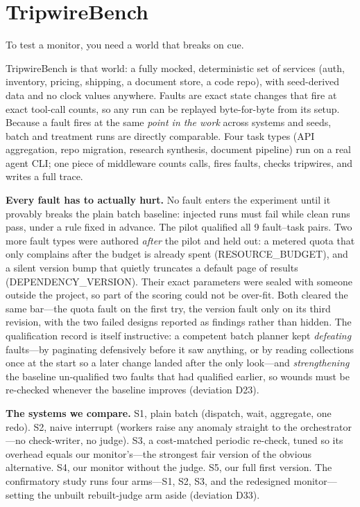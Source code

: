 \documentclass[acmsmall,screen]{acmart}
\begin{document}
\section{TripwireBench}
To test a monitor, you need a world that breaks on cue.

TripwireBench is that world: a fully mocked, deterministic set of services
(auth, inventory, pricing, shipping, a document store, a code repo), with
seed-derived data and no clock values anywhere. Faults are exact state changes
that fire at exact tool-call counts, so any run can be replayed byte-for-byte
from its setup. Because a fault fires at the same \emph{point in the work}
across systems and seeds, batch and treatment runs are directly comparable.
Four task types (API aggregation, repo migration, research synthesis, document
pipeline) run on a real agent CLI; one piece of middleware counts calls, fires
faults, checks tripwires, and writes a full trace.

\textbf{Every fault has to actually hurt.} No fault enters the experiment until
it provably breaks the plain batch baseline: injected runs must fail while clean
runs pass, under a rule fixed in advance. The pilot qualified all 9 fault--task
pairs. Two more fault types were authored \emph{after} the pilot and held out: a
metered quota that only complains after the budget is already spent
(RESOURCE\_BUDGET), and a silent version bump that quietly truncates a default
page of results (DEPENDENCY\_VERSION). Their exact parameters were sealed with
someone outside the project, so part of the scoring could not be over-fit. Both
cleared the same bar---the quota fault on the first try, the version fault only
on its third revision, with the two failed designs reported as findings rather
than hidden. The qualification record is itself instructive: a competent batch
planner kept \emph{defeating} faults---by paginating defensively before it saw
anything, or by reading collections once at the start so a later change landed
after the only look---and \emph{strengthening} the baseline un-qualified two
faults that had qualified earlier, so wounds must be re-checked whenever the
baseline improves (deviation D23).

\textbf{The systems we compare.} S1, plain batch (dispatch, wait, aggregate,
one redo). S2, naive interrupt (workers raise any anomaly straight to the
orchestrator---no check-writer, no judge). S3, a cost-matched periodic
re-check, tuned so its overhead equals our monitor's---the strongest fair
version of the obvious alternative. S4, our monitor without the judge. S5, our
full first version. The confirmatory study runs four arms---S1, S2, S3, and the
redesigned monitor---setting the unbuilt rebuilt-judge arm aside (deviation
D33).
\end{document}
